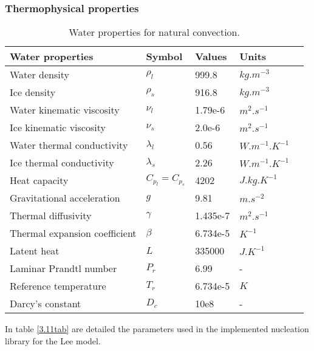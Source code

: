 \subsubsection*{Thermophysical properties}
\begin{table}[h!]
	\begin{tabular}{@{}lllll@{}}
		\toprule[1pt]
		\textbf{Water properties} & \textbf{Symbol} & \textbf{Values} & \textbf{Units} &  \\ \midrule[2pt]
		Water density & $\rho_l$ & 999.8 & $kg.m^{-3}$ \\
		Ice density & $\rho_s$ & 916.8 & $kg.m^{-3}$ \\		
		Water kinematic viscosity & $\nu_{l}$ & 1.79e-6 & $m^{2}.s^{-1}$ \\
		Ice kinematic viscosity & $\nu_{s}$ & 2.0e-6 & $m^{2}.s^{-1}$ \\		
		Water thermal conductivity & $\lambda_{l}$ & 0.56 & $W.m^{-1}.K^{-1}$ \\
		Ice thermal conductivity & $\lambda_{s}$ & 2.26 & $W.m^{-1}.K^{-1}$ \\		
		Heat capacity & $C_{p_{l}}=C_{p_{s}}$ & 4202 & $J.kg.K^{-1}$ \\		 
		Gravitational acceleration & $g$ &  9.81  & $m.s^{-2}$ \\
		Thermal diffusivity & $\gamma$ &  1.435e-7  & $m^{2}.s^{-1}$ \\		
		Thermal expansion coefficient & $\beta$ &  6.734e-5  & $K^{-1}$ \\
		Latent heat & $L$ &  335000  & $J.K^{-1}$ \\			
		Laminar Prandtl number & $P_r$ &  6.99  & - \\
		Reference temperature & $T_r$ &  6.734e-5  & $K$ \\
		Darcy's constant & $D_c$ &  10e8  & - \\		 \bottomrule[1pt]		
	\end{tabular}
	\centering
	\caption{Water properties for natural convection.}	
	\label{3.10tab}
\end{table}
In table \ref{3.11tab} are detailed the parameters used in the implemented nucleation library for the Lee model.
